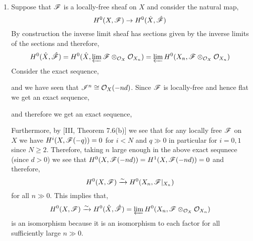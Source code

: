 \documentclass[12pt]{article}
\begin{document}
\begin{enumerate}
\item Suppose that $\mathscr{F}$ is a locally-free sheaf on $X$ and consider the natural map,
\[ H^0(X, \mathscr{F}) \to H^0(\hat{X}, \hat{\mathscr{F}}) \]
By construction the inverse limit sheaf has sections given by the inverse limits of the sections and therefore,
\[ H^0(\hat{X}, \hat{\mathscr{F}}) = H^0(\hat{X}, \varprojlim \mathscr{F} \otimes_{\mathcal{O}_{X}} \mathcal{O}_{X_n}) = \varprojlim H^0(X_n, \mathscr{F} \otimes_{\mathcal{O}_{X}} \mathcal{O}_{X_n}) \]
Consider the exact sequence,
\begin{center}
\end{center}
and we have seen that $\mathscr{I}^n \cong \mathcal{O}_{X}(-nd)$. Since $\mathscr{F}$ is locally-free and hence flat we get an exact sequence,
\begin{center}
\end{center}
and therefore we get an exact sequence,
\begin{center}
\end{center}
Furthermore, by [III, Theorem 7.6(b)] we see that for any locally free $\mathscr{F}$ on $X$ we have $H^i(X, \mathscr{F}(-q)) = 0$ for $i < N$ and $q \gg 0$ in particular for $i = 0,1$ since $N \ge 2$. Therefore, taking $n$ large enough in the above exact sequnece (since $d > 0$) we see that $H^0(X, \mathscr{F}(-nd)) = H^1(X, \mathscr{F}(-nd)) = 0$ and therefore, 
\[ H^0(X, \mathscr{F}) \xrightarrow{\sim} H^0(X_n, \mathscr{F} |_{X_n}) \]
for all $n \gg 0$. This implies that,
\[ H^0(X, \mathscr{F}) \xrightarrow{\sim} H^0(\hat{X}, \hat{\mathscr{F}}) = \varprojlim H^0(X_n, \mathscr{F} \otimes_{\mathcal{O}_{X}} \mathcal{O}_{X_n}) \]
is an isomorphism because it is an isomorphism to each factor for all sufficiently large $n \gg 0$.


\end{enumerate}
\end{document}
